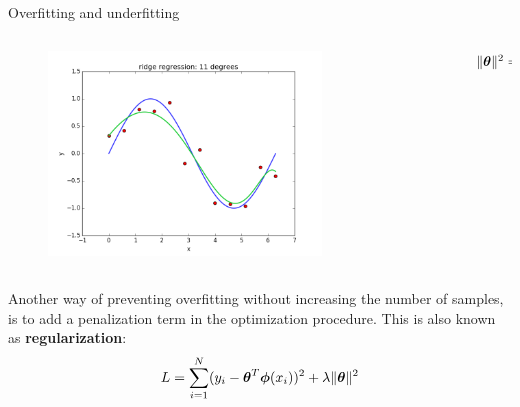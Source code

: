 \documentclass[xcolor=pdftex,dvipsnames,table,mathserif]{beamer}
\begin{document}
\begin{frame}{Overfitting and underfitting}
\begin{columns}
\begin{column}{.8\textwidth}
\begin{figure}[htb]
	\includegraphics[width=0.75\textwidth]{../graphics/ridge_regression_11_10.png}
\end{figure}
\end{column}
\begin{column}{.2\textwidth}
$\| \boldsymbol{\theta} \|^2 = 0.41$
\end{column}
\end{columns}
Another way of preventing overfitting without increasing the number of samples, is to add a penalization term in the optimization procedure. This is also known as \textbf{regularization}:
\begin{equation}
	L = \sum_{i=1}^N (y_i - \boldsymbol{\theta}^T \boldsymbol{\phi} (x_i))^2 + \lambda \| \boldsymbol{\theta} \|^2
\end{equation}
\end{frame}
\end{document}
